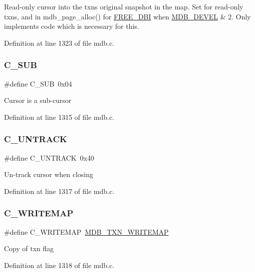 Read-\/only cursor into the txn\textquotesingle{}s original snapshot in the map. Set for read-\/only txns, and in mdb\+\_\+page\+\_\+alloc() for \mbox{\hyperlink{group__internal_ga3aa4d92eab9197f1d5f24403b1cfaaca}{F\+R\+E\+E\+\_\+\+D\+BI}} when \mbox{\hyperlink{group__compat_ga103b045068a1d21bf2347a7342f8f486}{M\+D\+B\+\_\+\+D\+E\+V\+EL}} \& 2. Only implements code which is necessary for this. 

Definition at line 1323 of file mdb.\+c.

\mbox{\label{group__mdb__cursor_ga31bd2871aca0e24b95e6d50b916f7b5b}} 
\subsubsection{\texorpdfstring{C\+\_\+\+S\+UB}{C\_SUB}}
{\footnotesize\ttfamily \#define C\+\_\+\+S\+UB~0x04}

Cursor is a sub-\/cursor 

Definition at line 1315 of file mdb.\+c.

\mbox{\label{group__mdb__cursor_ga79af151f605df221750d7cecbbf498eb}} 
\subsubsection{\texorpdfstring{C\+\_\+\+U\+N\+T\+R\+A\+CK}{C\_UNTRACK}}
{\footnotesize\ttfamily \#define C\+\_\+\+U\+N\+T\+R\+A\+CK~0x40}

Un-\/track cursor when closing 

Definition at line 1317 of file mdb.\+c.

\mbox{\label{group__mdb__cursor_gac4a428761468f9013ada1d11512e5539}} 
\subsubsection{\texorpdfstring{C\+\_\+\+W\+R\+I\+T\+E\+M\+AP}{C\_WRITEMAP}}
{\footnotesize\ttfamily \#define C\+\_\+\+W\+R\+I\+T\+E\+M\+AP~\mbox{\hyperlink{group__mdb__txn_ga03da701716875fe8b56118a63a4106ab}{M\+D\+B\+\_\+\+T\+X\+N\+\_\+\+W\+R\+I\+T\+E\+M\+AP}}}

Copy of txn flag 

Definition at line 1318 of file mdb.\+c.


